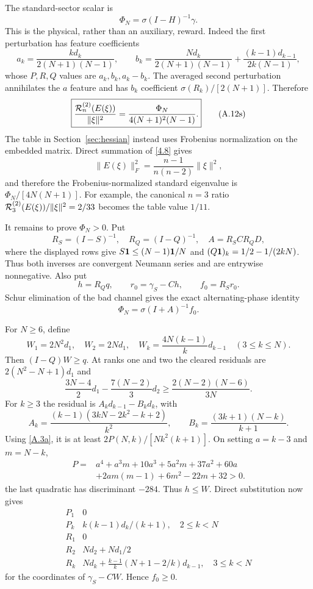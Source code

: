 The standard-sector scalar is
\[
 \Phi_N=\sigma(I-H)^{-1}\gamma.                            \tag{A.10s}\label{A.10s}
\]
This is the physical, rather than an auxiliary, reward.  Indeed the first
perturbation has feature coefficients
\[
 a_k={\frac{kd_k}{2(N+1)(N-1)}},\qquad
 b_k={\frac{Nd_k}{2(N+1)(N-1)}}
      +{\frac{(k-1)d_{k-1}}{2k(N-1)}},                         \tag{A.11s}\label{A.11s}
\]
whose $P,R,Q$ values are $a_k,b_k,a_k-b_k$.  The averaged second
perturbation annihilates the $a$ feature and has $b_k$ coefficient
$\sigma(R_k)/[2(N+1)]$.  Therefore
\[
 \boxed{{\frac{\mathcal R^{(2)}_n(E(\xi))}{\|\xi\|^2}}
 = {\frac{\Phi_N}{4(N+1)^2(N-1)}}.}                            \tag{A.12s}\label{A.12s}
\]
The table in Section~\ref{sec:hessian} instead uses Frobenius normalization
on the embedded matrix.  Direct summation of \eqref{4.8} gives
\[
 \|E(\xi)\|_F^2
 =\frac{n-1}{n(n-2)}\|\xi\|^2,                               \tag{A.12n}\label{A.12n}
\]
and therefore the Frobenius-normalized standard eigenvalue is
$\Phi_N/[4N(N+1)]$.  For example, the canonical $n=3$ ratio
$\mathcal R^{(2)}_3(E(\xi))/\|\xi\|^2=2/33$ becomes the table value $1/11$.

It remains to prove $\Phi_N>0$.  Put
\[
 R_S=(I-S)^{-1},\quad R_Q=(I-Q)^{-1},\quad
 A=R_SCR_QD,
\]
where the displayed rows give
$S\mathbf 1\le(N-1)\mathbf 1/N$ and
$(Q\mathbf 1)_k=1/2-1/(2kN)$.  Thus both inverses are convergent Neumann series
and are entrywise nonnegative.  Also put
\[
 h=R_Qq,\qquad r_0=\gamma_S-Ch,\qquad f_0=R_Sr_0.          \tag{A.13s}\label{A.13s}
\]
Schur elimination of the bad channel gives the exact alternating-phase
identity
\[
 \Phi_N=\sigma(I+A)^{-1}f_0.                               \tag{A.14s}\label{A.14s}
\]

For $N\ge6$, define
\[
 W_1=2N^2d_1,\quad W_2=2Nd_1,\quad
 W_k={\frac{4N(k-1)}{ k}}d_{k-1}\quad(3\le k\le N).           \tag{A.15s}\label{A.15s}
\]
Then $(I-Q)W\ge q$.  At ranks one and two the cleared residuals are
$2(N^2-N+1)d_1$ and
\[
 {\frac{3N-4}{2}}d_1-{\frac{7(N-2)}{3}}d_2
 \ge {\frac{2(N-2)(N-6)}{3N}}.
\]
For $k\ge3$ the residual is $A_kd_{k-1}-B_kd_k$, with
\[
 A_k={\frac{(k-1)(3kN-2k^2-k+2)}{ k^2}},\qquad
 B_k={\frac{(3k+1)(N-k)}{ k+1}}.
\]
Using \eqref{A.3a}, it is at least
$2P(N,k)/[Nk^2(k+1)]$.  On setting $a=k-3$ and $m=N-k$,
\[
\begin{aligned}
P={}&a^4+a^3m+10a^3+5a^2m+37a^2+60a\\
   &+2am(m-1)+6m^2-22m+32>0.
\end{aligned}                                               \tag{A.16s}\label{A.16s}
\]
the last quadratic has discriminant $-284$.  Thus $h\le W$.  Direct
substitution now gives
\[
\begin{array}{c|c}
P_1&0\\
P_k&k(k-1)d_k/(k+1),\quad 2\le k<N\\
R_1&0\\
R_2&Nd_2+Nd_1/2\\
R_k&Nd_k+{\frac{k-1}{ k}}(N+1-2/k)d_{k-1},\quad 3\le k<N
\end{array}                                                \tag{A.17s}\label{A.17s}
\]
for the coordinates of $\gamma_S-CW$.  Hence $f_0\ge0$.

